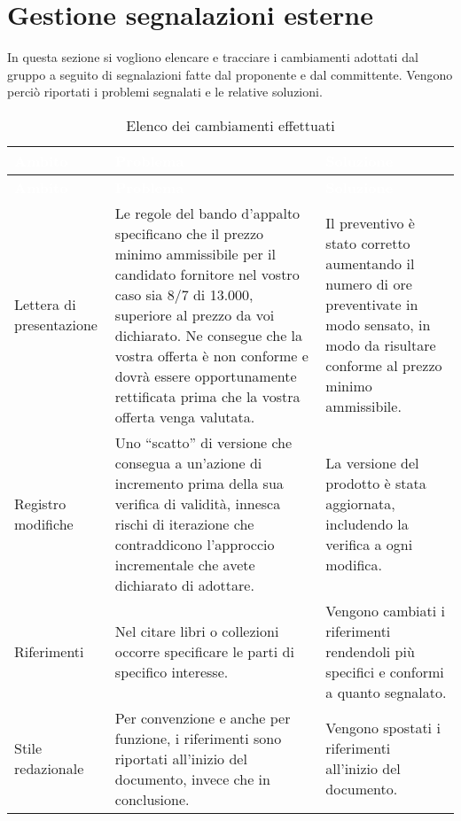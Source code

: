 \section{Gestione segnalazioni esterne}
In questa sezione si vogliono elencare e tracciare i cambiamenti adottati dal gruppo a seguito di segnalazioni fatte dal proponente e dal committente. Vengono perciò riportati i problemi segnalati e le relative soluzioni. 
{
	\renewcommand{\arraystretch}{1.5}
	\centering
	\begin{longtable}{ C{2cm} C{6cm} C{6cm}}
		\caption{Elenco dei cambiamenti effettuati}\\
		\textcolor{white}{\textbf{Ambito}} & \textcolor{white}{\textbf{Problema}} & \textcolor{white}{\textbf{Soluzione}}\\
		\endfirsthead
		\textcolor{white}{\textbf{Ambito}} & \textcolor{white}{\textbf{Problema}} & \textcolor{white}{\textbf{Soluzione}}\\
		\endhead
		Lettera di presentazione & Le regole del
		bando d’appalto specificano che il prezzo minimo ammissibile per il
		candidato fornitore nel vostro caso sia 8/7 di 13.000, superiore al prezzo da
		voi dichiarato. Ne consegue che la vostra offerta è non conforme e dovrà
		essere opportunamente rettificata prima che la vostra offerta venga valutata.
		& Il preventivo è stato corretto aumentando il numero di ore preventivate in modo sensato, in modo da risultare conforme al prezzo minimo ammissibile.\\
		
		Registro modifiche &  Uno “scatto” di versione che
		consegua a un’azione di incremento prima della sua verifica di validità,
		innesca rischi di iterazione che contraddicono l’approccio incrementale che
		avete dichiarato di adottare. & La versione del prodotto è stata aggiornata, includendo la verifica a ogni modifica.\\
		
		Riferimenti & Nel citare libri o collezioni occorre specificare le parti di specifico interesse. & Vengono cambiati i riferimenti rendendoli più specifici e conformi a quanto segnalato.\\
		
		Stile redazionale & Per convenzione e anche per funzione, i riferimenti sono riportati all’inizio del documento, invece che in conclusione. & Vengono spostati i riferimenti all'inizio del documento.\\
		

\end{longtable}}
